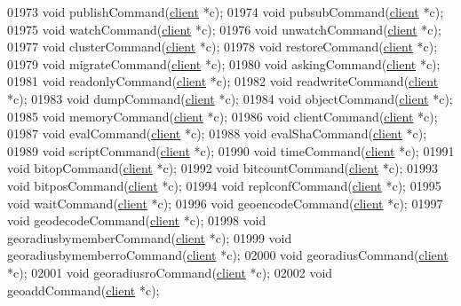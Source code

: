 \begin{DoxyCode}
{{{{{{{01973 \textcolor{keywordtype}{void} publishCommand(\hyperlink{structclient}{client} *c);
01974 \textcolor{keywordtype}{void} pubsubCommand(\hyperlink{structclient}{client} *c);
01975 \textcolor{keywordtype}{void} watchCommand(\hyperlink{structclient}{client} *c);
01976 \textcolor{keywordtype}{void} unwatchCommand(\hyperlink{structclient}{client} *c);
01977 \textcolor{keywordtype}{void} clusterCommand(\hyperlink{structclient}{client} *c);
01978 \textcolor{keywordtype}{void} restoreCommand(\hyperlink{structclient}{client} *c);
01979 \textcolor{keywordtype}{void} migrateCommand(\hyperlink{structclient}{client} *c);
01980 \textcolor{keywordtype}{void} askingCommand(\hyperlink{structclient}{client} *c);
01981 \textcolor{keywordtype}{void} readonlyCommand(\hyperlink{structclient}{client} *c);
01982 \textcolor{keywordtype}{void} readwriteCommand(\hyperlink{structclient}{client} *c);
01983 \textcolor{keywordtype}{void} dumpCommand(\hyperlink{structclient}{client} *c);
01984 \textcolor{keywordtype}{void} objectCommand(\hyperlink{structclient}{client} *c);
01985 \textcolor{keywordtype}{void} memoryCommand(\hyperlink{structclient}{client} *c);
01986 \textcolor{keywordtype}{void} clientCommand(\hyperlink{structclient}{client} *c);
01987 \textcolor{keywordtype}{void} evalCommand(\hyperlink{structclient}{client} *c);
01988 \textcolor{keywordtype}{void} evalShaCommand(\hyperlink{structclient}{client} *c);
01989 \textcolor{keywordtype}{void} scriptCommand(\hyperlink{structclient}{client} *c);
01990 \textcolor{keywordtype}{void} timeCommand(\hyperlink{structclient}{client} *c);
01991 \textcolor{keywordtype}{void} bitopCommand(\hyperlink{structclient}{client} *c);
01992 \textcolor{keywordtype}{void} bitcountCommand(\hyperlink{structclient}{client} *c);
01993 \textcolor{keywordtype}{void} bitposCommand(\hyperlink{structclient}{client} *c);
01994 \textcolor{keywordtype}{void} replconfCommand(\hyperlink{structclient}{client} *c);
01995 \textcolor{keywordtype}{void} waitCommand(\hyperlink{structclient}{client} *c);
01996 \textcolor{keywordtype}{void} geoencodeCommand(\hyperlink{structclient}{client} *c);
01997 \textcolor{keywordtype}{void} geodecodeCommand(\hyperlink{structclient}{client} *c);
01998 \textcolor{keywordtype}{void} georadiusbymemberCommand(\hyperlink{structclient}{client} *c);
01999 \textcolor{keywordtype}{void} georadiusbymemberroCommand(\hyperlink{structclient}{client} *c);
02000 \textcolor{keywordtype}{void} georadiusCommand(\hyperlink{structclient}{client} *c);
02001 \textcolor{keywordtype}{void} georadiusroCommand(\hyperlink{structclient}{client} *c);
02002 \textcolor{keywordtype}{void} geoaddCommand(\hyperlink{structclient}{client} *c);
}}}}}}}
\end{DoxyCode}
